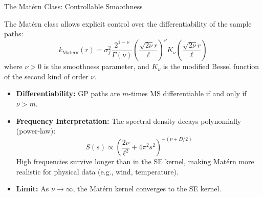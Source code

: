 \documentclass[aspectratio=169, 10pt]{beamer}
\begin{document}
\begin{frame}{The Matérn Class: Controllable Smoothness}
  
  The Matérn class allows explicit control over the differentiability of the sample paths:
  \[
    k_{\text{Matern}}(r) = \sigma_f^2 \frac{2^{1-\nu}}{\Gamma(\nu)} \left(\frac{\sqrt{2\nu}r}{\ell}\right)^\nu K_\nu\left(\frac{\sqrt{2\nu}r}{\ell}\right)
  \]
  where $\nu > 0$ is the smoothness parameter, and $K_\nu$ is the modified Bessel function of the second kind of order $\nu$.
  
  \begin{itemize}
    \item \textbf{Differentiability:} GP paths are $m$-times MS differentiable if and only if $\nu > m$.
      
    \item \textbf{Frequency Interpretation:} The spectral density decays polynomially (power-law):
      \[ S(s) \propto \left(\frac{2\nu}{\ell^2} + 4\pi^2 s^2\right)^{-(\nu + D/2)} \]
      High frequencies survive longer than in the SE kernel, making Matérn more realistic for physical data (e.g., wind, temperature).
      
    \item \textbf{Limit:} As $\nu \to \infty$, the Matérn kernel converges to the SE kernel.
  \end{itemize}
\end{frame}
\end{document}
